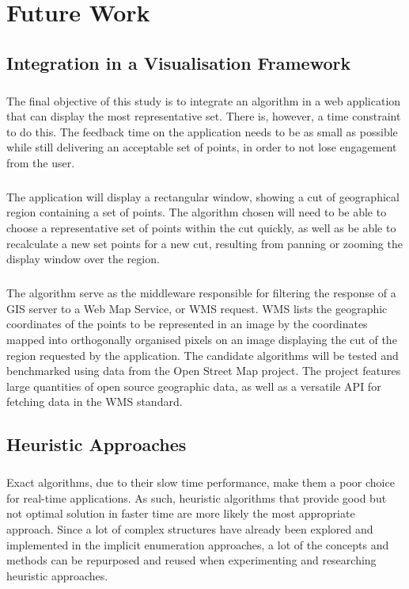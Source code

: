 \chapter{Future Work}
\label{chap:future}
\section{Integration in a Visualisation Framework}
\paragraph{}
The final objective of this study is to integrate an algorithm in a web application that can display the most representative set. There is, however, a time constraint to do this. The feedback time on the application needs to be as small as possible while still delivering an acceptable set of points, in order to not lose engagement from the user.
\paragraph{}
The application will display a rectangular window, showing a cut of geographical region containing a set of points. The algorithm chosen will need to be able to choose a representative set of points within the cut quickly, as well as be able to recalculate a new set points for a new cut, resulting from panning or zooming the display window over the region.
\paragraph{}
The algorithm serve as the middleware responsible for filtering the response of a GIS server to a Web Map Service, or WMS request. WMS lists the geographic coordinates of the points to be represented in an image by the coordinates mapped into orthogonally organised pixels on an image displaying the cut of the region requested by the application.
The candidate algorithms will be tested and benchmarked using data from the Open Street Map project. The project features large quantities of open source geographic data, as well as a versatile API for fetching data in the WMS standard.
\section{Heuristic Approaches}
\paragraph{}
Exact algorithms, due to their slow time performance, make them a poor choice for real-time applications. As such, heuristic algorithms that provide good but not optimal solution in faster time are more likely the most appropriate approach.
Since a lot of complex structures have already been explored and implemented in the implicit enumeration approaches, a lot of the concepts and methods can be repurposed and reused when experimenting and researching heuristic approaches. 
